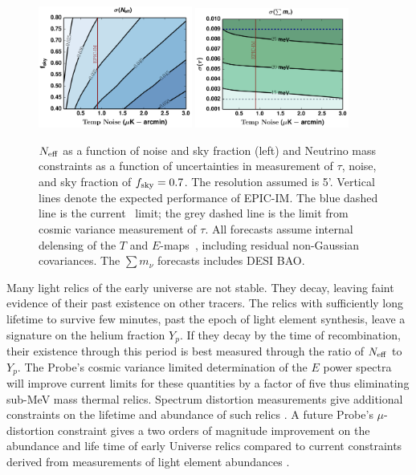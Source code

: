 \begin{figure}[t!]
\begin{center}
\includegraphics[width=0.45\textwidth]{figs/Neff.pdf}
\includegraphics[width=0.45\textwidth]{figs/Mnu_tauprior.pdf}
\caption{ \small \setlength{\baselineskip}{0.95\baselineskip}
${N_{\rm eff}}$ as a function of noise and sky fraction (left) and
Neutrino mass constraints as a function of uncertainties in measurement of $\tau$, noise, and 
sky fraction of $f_{\rm sky} = 0.7$. The resolution assumed is 5'.  
Vertical lines denote the expected performance of EPIC-IM. 
The blue dashed line is the current \planck~limit; the grey dashed line is the limit from cosmic variance 
measurement of $\tau$. All forecasts assume internal delensing of the $T$ and $E$-maps~\cite{Green:2016cjr}, 
including residual non-Gaussian covariances.  The $\sum m_\nu$ forecasts includes DESI BAO.  
\label{fig:Neff_future} }
\end{center}
\vspace{-0.15in}
\end{figure}

Many light relics of the early universe are not stable. They decay, 
leaving faint evidence of their past existence on other tracers. The relics with sufficiently long lifetime to survive few minutes, 
past the epoch of light element synthesis, leave a signature on the helium fraction $Y_p$.  If they decay 
by the time of recombination, their existence through this period is best measured through the ratio of ${N_{\rm eff}}$ to $Y_p$. 
The Probe's cosmic variance limited determination 
of the $E$ power spectra will improve current limits for these quantities by
a factor of five thus eliminating sub-MeV mass thermal relics. 
%  
Spectrum distortion measurements give additional constraints on the lifetime and abundance 
of such relics \citep{Sarkar1984, Kawasaki1986, Hu1993b, Chluba2011therm}. A future Probe's $\mu$-distortion constraint gives a two orders of magnitude improvement on the abundance and life time of early Universe relics \cite{Chluba2013fore, Chluba2013PCA} compared to current constraints derived from measurements of light element abundances \cite{Kawasaki2005, Jedamzik2006}.

